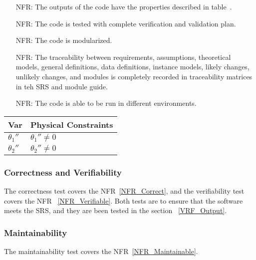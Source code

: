 \documentclass[12pt, titlepage]{article}
\newcounter{reqnum} %
\begin{document}
\noindent \begin{itemize}

\item[NFR\refstepcounter{reqnum}\thereqnum \label{NFR_Correct}:] 
The outputs of the code have the properties described in table~.
\item[NFR\refstepcounter{reqnum}\thereqnum \label{NFR_Verifiable}:]  
The code is tested with complete verification and validation plan.
\item[NFR\refstepcounter{reqnum}\thereqnum \label{NFR_Reusable}:]
The code is modularized. 
\item[NFR\refstepcounter{reqnum}\thereqnum \label{NFR_Maintainable}:] The
  traceability between requirements, assumptions, theoretical models, general
  definitions, data definitions, instance models, likely changes, unlikely
  changes, and modules is completely recorded in traceability matrices in teh
  SRS and module guide.
\item[NFR\refstepcounter{reqnum}\thereqnum \label{NFR_Portable}:]
The code is able to be run in different environments. 
\end{itemize}

\begin{table}[H]
\caption{Output Variables} \label{TblOutputVar}
\renewcommand{\arraystretch}{1.2}
\noindent \begin{longtable*}{l l} 
  \toprule
  \textbf{Var} & \textbf{Physical Constraints} \\
  \midrule 
  ${\theta_1}''$ & ${\theta_1}'' \neq 0$\\
  ${\theta_2}''$ & ${\theta_2}'' \neq 0$\\
  \bottomrule
\end{longtable*}
\end{table}

\subsubsection{Correctness and Verifiability}\label{CnV}
		
The correctness test covers the NFR~\ref{NFR_Correct}, and the verifiability
test covers the NFR ~\ref{NFR_Verifiable}. Both tests are to ensure that the
software meets the SRS, and they are been tested in the section
~\ref{VRF_Output}.

\subsubsection{Maintainability}\label{MainTest}
The maintainability test covers the NFR~\ref{NFR_Maintainable}. 
\end{document}
